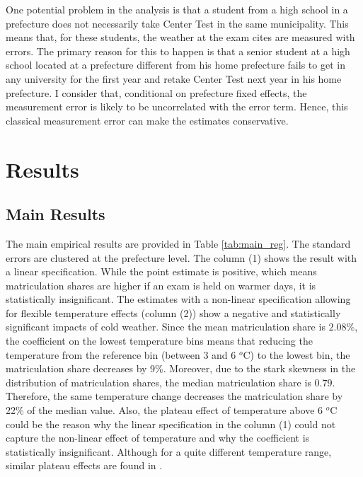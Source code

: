 \documentclass[12pt,letterpaper]{article}
\begin{document}
One potential problem in the analysis is that a student from a high school in a prefecture does not necessarily take Center Test in the same municipality.
This means that, for these students, the weather at the exam cites are measured with errors.
The primary reason for this to happen is that a senior student at a high school located at a prefecture different from his home prefecture fails to get in any university for the first year and retake Center Test next year in his home prefecture.
I consider that, conditional on prefecture fixed effects, the measurement error is likely to be uncorrelated with the error term.
Hence, this classical measurement error can make the estimates conservative.


\section{Results}\label{sec:results}

\subsection{Main Results}

The main empirical results are provided in Table \ref{tab:main_reg}.
The standard errors are clustered at the prefecture level.
The column (1) shows the result with a linear specification.
While the point estimate is positive, which means matriculation shares are higher if an exam is held on warmer days, it is statistically insignificant. 
The estimates with a non-linear specification allowing for flexible temperature effects (column (2)) show a negative and statistically significant impacts of cold weather. 
Since the mean matriculation share is $2.08$\%, the coefficient on the lowest temperature bins means that reducing the temperature from the reference bin (between 3 and 6 $^o$C) to the lowest bin, the matriculation share decreases by 9\%.
Moreover, due to the stark skewness in the distribution of matriculation shares, the median matriculation share is $0.79$.
Therefore, the same temperature change decreases the matriculation share by 22\% of the median value.
Also, the plateau effect of temperature above 6 $^o$C could be the reason why the linear specification in the column (1) could not capture the non-linear effect of temperature and why the coefficient is statistically insignificant.
Although for a quite different temperature range, similar plateau effects are found in \citet{Park2020a}.
\end{document}
